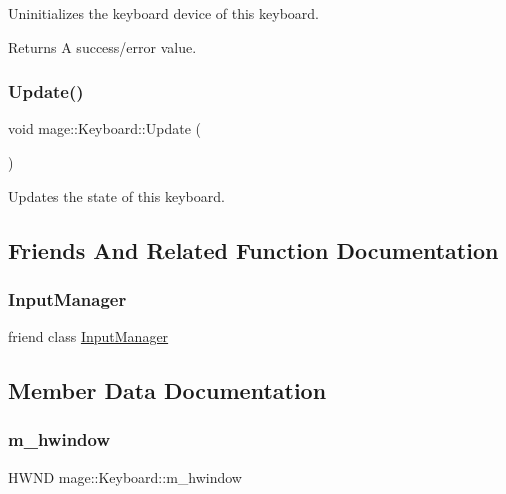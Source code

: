 Uninitializes the keyboard device of this keyboard.

\begin{DoxyReturn}{Returns}
A success/error value. 
\end{DoxyReturn}
\hypertarget{classmage_1_1_keyboard_abb5fd91a304f8bbf8b15ab1a277dafaf}{}\label{classmage_1_1_keyboard_abb5fd91a304f8bbf8b15ab1a277dafaf} 
\subsubsection{\texorpdfstring{Update()}{Update()}}
{\footnotesize\ttfamily void mage\+::\+Keyboard\+::\+Update (\begin{DoxyParamCaption}{ }\end{DoxyParamCaption})\hspace{0.3cm}{\ttfamily [protected]}}

Updates the state of this keyboard. 

\subsection{Friends And Related Function Documentation}
\hypertarget{classmage_1_1_keyboard_af0e8c3dcc20b7ddcaf63506363a22821}{}\label{classmage_1_1_keyboard_af0e8c3dcc20b7ddcaf63506363a22821} 
\subsubsection{\texorpdfstring{Input\+Manager}{InputManager}}
{\footnotesize\ttfamily friend class \hyperlink{classmage_1_1_input_manager}{Input\+Manager}\hspace{0.3cm}{\ttfamily [friend]}}



\subsection{Member Data Documentation}
\hypertarget{classmage_1_1_keyboard_aa7196c689dad6f5aaf35e3929de02791}{}\label{classmage_1_1_keyboard_aa7196c689dad6f5aaf35e3929de02791} 
\subsubsection{\texorpdfstring{m\+\_\+hwindow}{m\_hwindow}}
{\footnotesize\ttfamily H\+W\+ND mage\+::\+Keyboard\+::m\+\_\+hwindow\hspace{0.3cm}{\ttfamily [protected]}}

